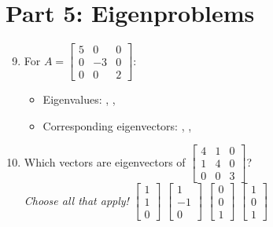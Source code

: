 \documentclass{article}
\begin{document}
\newpage

\section*{Part 5: Eigenproblems}
\begin{enumerate}
	\setcounter{enumi}{8}
	\item For $A = \begin{bmatrix} 5 & 0 & 0 \\ 0 & -3 & 0 \\ 0 & 0 & 2 \end{bmatrix}$:
	\begin{itemize}
		\item Eigenvalues: \underline{\hspace{1cm}}, \underline{\hspace{1cm}}, \underline{\hspace{1cm}}
		\item Corresponding eigenvectors: \underline{\hspace{3cm}}, \underline{\hspace{3cm}}, \underline{\hspace{3cm}}
	\end{itemize}
	
	\item Which vectors are eigenvectors of $\begin{bmatrix} 4 & 1 & 0 \\ 1 & 4 & 0 \\ 0 & 0 & 3 \end{bmatrix}$? \\ 
	\textit{Choose all that apply!}
	\bigskip
	$\begin{bmatrix} 1 \\ 1 \\ 0 \end{bmatrix}$ \hspace{0.5cm} 
	$\begin{bmatrix} 1 \\ -1 \\ 0 \end{bmatrix}$ \hspace{0.5cm} 
	$\begin{bmatrix} 0 \\ 0 \\ 1 \end{bmatrix}$ \hspace{0.5cm} 
	$\begin{bmatrix} 1 \\ 0 \\ 1 \end{bmatrix}$
\end{enumerate}
\end{document}
